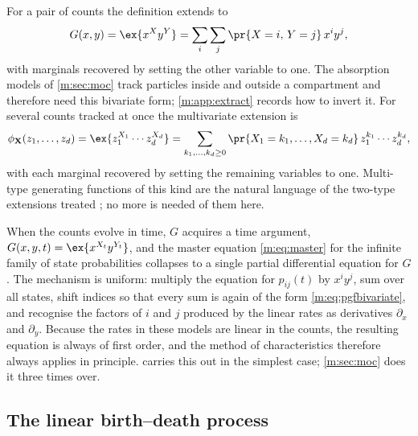 For a pair of counts the definition extends to
\begin{equation}
\label{m:eq:pgfbivariate}
G(x,y) = \ex{x^{X}y^{Y}} = \sum_{i}\sum_{j}\pr{X=i,\,Y=j}\,x^iy^j ,
\end{equation}
with marginals recovered by setting the other variable to one. The absorption
models of \cref{m:sec:moc} track particles inside and outside a compartment and
therefore need this bivariate form; \cref{m:app:extract} records how to invert it.
For several counts tracked at once the multivariate extension is
\begin{equation}
\label{m:eq:pgfmulti}
\phi_{\mathbf X}(z_1,\dots,z_d)
= \ex{z_1^{X_1}\cdots z_d^{X_d}}
= \sum_{k_1,\dots,k_d\ge0}\pr{X_1=k_1,\dots,X_d=k_d}\,z_1^{k_1}\cdots z_d^{k_d},
\end{equation}
with each marginal recovered by setting the remaining variables to one. Multi-type
generating functions of this kind are the natural language of the two-type
extensions treated ; no more
is needed of them here.

When the counts evolve in time, $G$ acquires a time argument,
$G(x,y,t) = \ex{x^{X_t}y^{Y_t}}$, and the master equation \cref{m:eq:master} for the
infinite family of state probabilities collapses to a single partial differential
equation for $G$. The mechanism is uniform: multiply the equation for
$p_{ij}(t)$ by $x^iy^j$, sum over all states, shift indices so that every sum is
again of the form \cref{m:eq:pgfbivariate}, and recognise the factors of $i$ and $j$
produced by the linear rates as derivatives $\partial_x$ and $\partial_y$. Because
the rates in these models are linear in the counts, the resulting equation is
always of first order, and the method of characteristics therefore always applies
in principle.  carries this out in the simplest case;
\cref{m:sec:moc} does it three times over.

\subsection{The linear birth--death process}
\label{m:sec:linbd}

